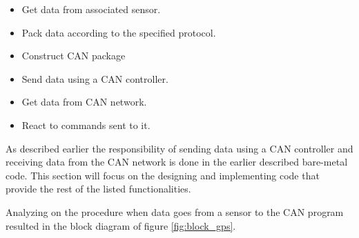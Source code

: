 \begin{itemize}
\item Get data from associated sensor.
\item Pack data according to the specified protocol.
\item Construct CAN package
\item Send data using a CAN controller.
\item Get data from CAN network.
\item React to commands sent to it.
\end{itemize}

As described earlier the responsibility of sending data using a CAN controller and receiving data from the CAN network is done in the earlier described bare-metal code.
This section will focus on the designing and implementing code that provide the rest of the listed functionalities.

Analyzing on the procedure when data goes from a sensor to the CAN program resulted in the block diagram of figure \ref{fig:block_gps}.

